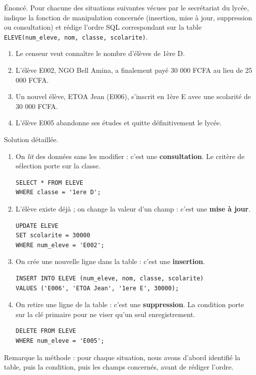 \documentclass[11pt]{article}
\begin{document}
\begin{exoresolu}
Énoncé. Pour chacune des situations suivantes vécues par le secrétariat du lycée, indique la fonction de manipulation concernée (insertion, mise à jour, suppression ou consultation) et rédige l'ordre SQL correspondant sur la table \texttt{ELEVE(\texttt{num\_eleve}, \texttt{nom}, \texttt{classe}, \texttt{scolarite})}.
\begin{enumerate}
\item Le censeur veut connaître le nombre d'élèves de 1ère D.
\item L'élève E002, NGO Bell Amina, a finalement payé 30 000 FCFA au lieu de 25 000 FCFA.
\item Un nouvel élève, ETOA Jean (E006), s'inscrit en 1ère E avec une scolarité de 30 000 FCFA.
\item L'élève E005 abandonne ses études et quitte définitivement le lycée.
\end{enumerate}
\tcblower
Solution détaillée.
\begin{enumerate}
\item On \emph{lit} des données sans les modifier : c'est une \textbf{consultation}. Le critère de sélection porte sur la classe.
\begin{lstlisting}
SELECT * FROM ELEVE
WHERE classe = '1ere D';
\end{lstlisting}
\item L'élève existe déjà ; on change la valeur d'un champ : c'est une \textbf{mise à jour}.
\begin{lstlisting}
UPDATE ELEVE
SET scolarite = 30000
WHERE num_eleve = 'E002';
\end{lstlisting}
\item On crée une nouvelle ligne dans la table : c'est une \textbf{insertion}.
\begin{lstlisting}
INSERT INTO ELEVE (num_eleve, nom, classe, scolarite)
VALUES ('E006', 'ETOA Jean', '1ere E', 30000);
\end{lstlisting}
\item On retire une ligne de la table : c'est une \textbf{suppression}. La condition porte sur la clé primaire pour ne viser qu'un seul enregistrement.
\begin{lstlisting}
DELETE FROM ELEVE
WHERE num_eleve = 'E005';
\end{lstlisting}
\end{enumerate}
Remarque la méthode : pour chaque situation, nous avons d'abord identifié la table, puis la condition, puis les champs concernés, avant de rédiger l'ordre.
\end{exoresolu}
\end{document}
